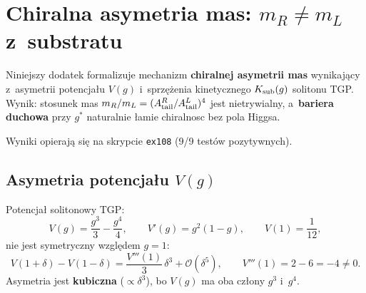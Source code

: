 \section{Chiralna asymetria mas: $m_R \neq m_L$ z~substratu}%
\label{app:K2-chiralnosc}

Niniejszy dodatek formalizuje mechanizm \textbf{chiralnej asymetrii
mas} wynikaj\k{a}cy z~asymetrii potencja\l{}u $V(g)$ i~sprzę\.zenia
kinetycznego $K_{\rm sub}(g)$ solitonu TGP.
Wynik: stosunek mas $m_R/m_L = (A_{\rm tail}^R/A_{\rm tail}^L)^4$
jest nietrywialny, a~\textbf{bariera duchowa} przy $g^*$ naturalnie
\l{}amie chiralnosc bez pola Higgsa.

Wyniki opieraj\k{a} si\k{e} na skrypcie \texttt{ex108} (9/9 test\'ow
pozytywnych).

\medskip
\noindent{}
\medskip

\subsection{Asymetria potencja\l{}u $V(g)$}\label{app:K2-Vasym}

\begin{proposition}\label{prop:K2-Vasym}
Potencja\l{} solitonowy TGP:
\begin{equation}\label{eq:K2-V}
  V(g) = \frac{g^3}{3} - \frac{g^4}{4},
  \qquad
  V'(g) = g^2(1 - g),
  \qquad
  V(1) = \frac{1}{12},
\end{equation}
nie jest symetryczny wzgl\k{e}dem $g = 1$:
\begin{equation}\label{eq:K2-Vasym-expansion}
  V(1+\delta) - V(1-\delta)
  = \frac{V'''(1)}{3}\,\delta^3 + \mathcal{O}(\delta^5),
  \qquad
  V'''(1) = 2 - 6 = -4 \neq 0.
\end{equation}
Asymetria jest \textbf{kubiczna} ($\propto \delta^3$),
bo $V(g)$ ma oba cz\l{}ony $g^3$ i~$g^4$.
\end{proposition}

